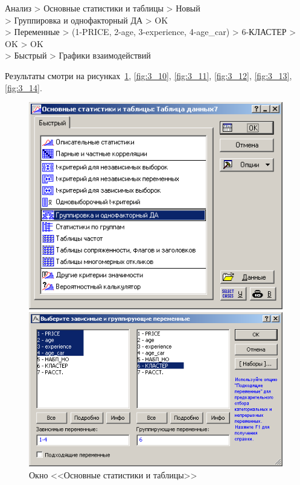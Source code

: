 Анализ > Основные статистики и таблицы > Новый\\
> Группировка и однофакторный ДА > OK\\
> Переменные > (1-PRICE, 2-age, 3-experience, 4-age\_car) > 6-КЛАСТЕР > OK > OK\\
> Быстрый > Графики взаимодействий

Результаты смотри на рисунках~\ref{fig:3_9}, \ref{fig:3_10}, \ref{fig:3_11}, \ref{fig:3_12}, \ref{fig:3_13}, \ref{fig:3_14}.

\begin{figure}[!h]
  \centering
  \begin{minipage}{0.32\textwidth}
    \centering

    \includegraphics[width=0.99\textwidth]
    {inc/cars_my/3.9.PNG}

    \caption{Окно <<Основные статистики и таблицы>>}
    \label{fig:3_9}
  \end{minipage}
  \begin{minipage}{0.32\textwidth}
    \centering

    \includegraphics[width=0.99\textwidth]
    {inc/cars_my/3.10.PNG}


\end{minipage}
\end{figure}

